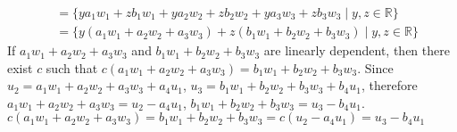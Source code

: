 \documentclass[10pt]{article}
\begin{document}
{{\begin{align}
			&= \{ya_1w_1 + zb_1w_1 + ya_2w_2 + zb_2w_2 + ya_3w_3 + zb_3w_3 \mid y, z \in \mathbb{R}\} \\
			&= \{y(a_1w_1 + a_2w_2 + a_3w_3) + z(b_1w_1 + b_2w_2 + b_3w_3) \mid y, z \in \mathbb{R}\}
		\end{align}
		If $a_1w_1 + a_2w_2 + a_3w_3$ and $b_1w_1 + b_2w_2 + b_3w_3$ are linearly 
		dependent, then there exist $c$ such that $c(a_1w_1 + a_2w_2 + a_3w_3) = 
		b_1w_1 + b_2w_2 + b_3w_3$. Since $u_2 = a_1w_1 + a_2w_2 + a_3w_3 + a_4u_1$, 
		$u_3 = b_1w_1 + b_2w_2 + b_3w_3 + b_4u_1$, 
		therefore $a_1w_1 + a_2w_2 + a_3w_3 = u_2 - a_4u_1$, $b_1w_1 + b_2w_2 + b_3w_3 = u_3 - b_4u_1$.
		$c(a_1w_1 + a_2w_2 + a_3w_3) = b_1w_1 + b_2w_2 + b_3w_3 = c(u_2 - a_4u_1) = u_3 - b_4u_1$
	}
}
\end{document}
